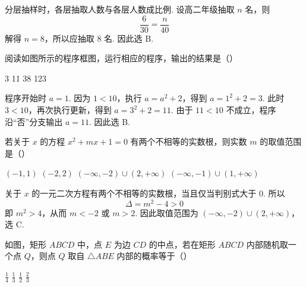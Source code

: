 
\begin{solution}
分层抽样时，各层抽取人数与各层人数成比例. 设高二年级抽取 \(n\) 名，则
\[
\frac{6}{30}=\frac{n}{40}
\]
解得 \(n=8\)，所以应抽取 8 名. 因此选 B.
\end{solution}

\begin{problem}
阅读如图所示的程序框图，运行相应的程序，输出的结果是（\quad）


\choices
    {3}
    {11}
    {38}
    {123}
\end{problem}


\begin{solution}
程序开始时 \(a=1\). 因为 \(1<10\)，执行 \(a=a^2+2\)，得到 \(a=1^2+2=3\). 此时 \(3<10\)，再次执行更新，得到 \(a=3^2+2=11\). 由于 \(11<10\) 不成立，程序沿“否”分支输出 \(a=11\). 因此选 B.
\end{solution}

\begin{problem}
若关于 \(x\) 的方程 \(x^{2} + mx + 1 = 0\) 有两个不相等的实数根，则实数 \(m\) 的取值范围是（\quad）

\choices
    {\((-1, 1)\)}
    {\((-2, 2)\)}
    {\((- \infty, -2) \cup (2, +\infty)\)}
    {\((-\infty, -1) \cup (1, +\infty)\)}
\end{problem}


\begin{solution}
关于 \(x\) 的一元二次方程有两个不相等的实数根，当且仅当判别式大于 \(0\). 所以
\[
\Delta=m^2-4>0
\]
即 \(m^2>4\)，从而 \(m<-2\) 或 \(m>2\). 因此取值范围为 \((-\infty,-2)\cup(2,+\infty)\)，选 C.
\end{solution}

\begin{problem}
如图，矩形 \(ABCD\) 中，点 \(E\) 为边 \(CD\) 的中点，若在矩形 \(ABCD\) 内部随机取一个点 \(Q\)，则点 \(Q\) 取自 \(\triangle ABE\) 内部的概率等于（\quad）

\begin{center}
\end{center}

\choices
    {\( \frac{1}{4} \)}
    {\( \frac{1}{3} \)}
    {\( \frac{1}{2} \)}
    {\( \frac{2}{3} \)}
\end{problem}

